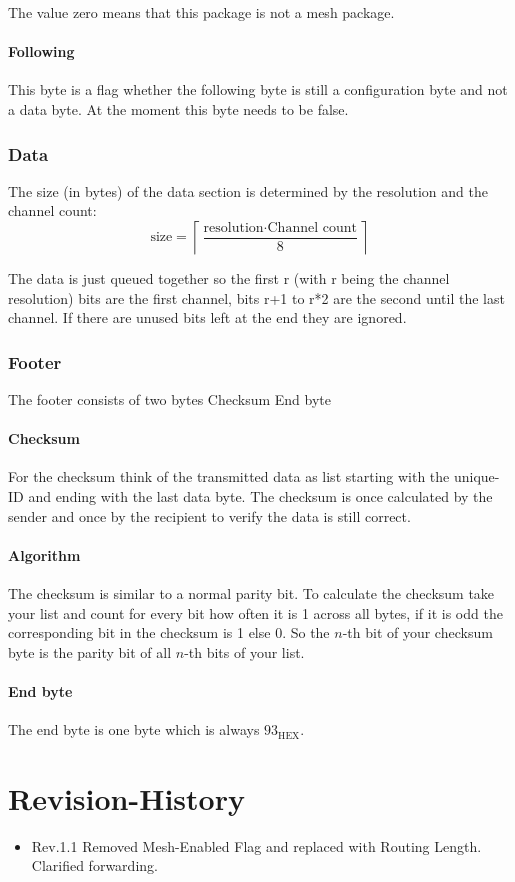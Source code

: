 \documentclass{scrreprt}
\begin{document}
The value zero means that this package is not a mesh package.

\subsubsection{Following}
This byte is a flag whether the following byte is still a configuration
byte and not a data byte. At the moment this byte needs to be false.

\subsection{Data}
The size (in bytes) of the data section is determined by
the resolution and the channel count:
\begin{equation}
  \text{size} = \left\lceil{\frac{\text{resolution} \cdot \text{Channel count}}{8}} \right\rceil
\end{equation}

The data is just queued together so the first r (with r being the channel
resolution) bits are the first channel, bits r+1 to r*2 are the second
until the last channel. If there are unused bits left at the end they are
ignored.

\subsection{Footer}
The footer consists of two bytes Checksum End byte

\subsubsection{Checksum}
For the checksum think of the transmitted data as list starting with the
unique-ID and ending with the last data byte. The checksum is once
calculated by the sender and once by the recipient to verify the data is
still correct.

\subsubsection{Algorithm}
The checksum is similar to a normal parity bit. To calculate the checksum
take your list and count for every bit how often it is 1 across all bytes,
if it is odd the corresponding bit in the checksum is 1 else 0.
So the $n$-th bit of your checksum byte is the parity bit of all $n$-th
bits of your list.

\subsubsection{End byte}
The end byte is one byte which is always $93_\text{HEX}$.

\pagebreak
\chapter{Revision-History}
\begin{itemize}
  \item Rev.1.1 Removed Mesh-Enabled Flag and replaced with Routing Length. Clarified forwarding.
\end{itemize}
\end{document}
